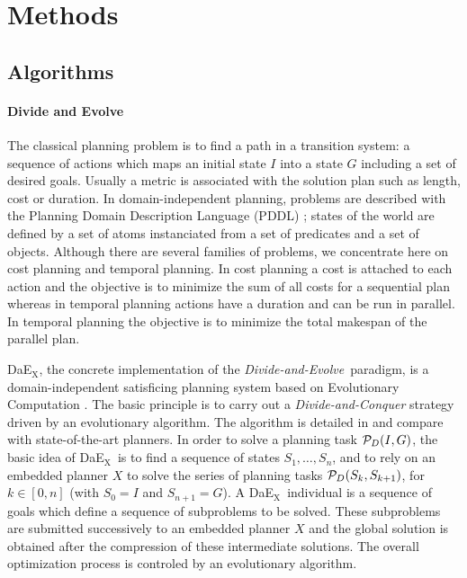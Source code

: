 \documentclass{sig-alternate}
\newcommand{\dae}{{\em Divide-and-Evolve}}
\newcommand{\DAEX}{{\sc DaE$_{\text{X}}$}}
\begin{document}
\section{Methods}

\subsection{Algorithms}

\paragraph{Divide and Evolve} %
The classical planning problem is to find a path in a transition system: a sequence of actions which maps an initial state $I$ into a state $G$ including a set of desired goals. Usually a metric is associated with the solution plan such as length, cost or duration. In domain-independent planning, problems are described with the Planning Domain Description Language (PDDL) \cite{pddl:jair2003}; states of the world are defined by a set of atoms instanciated from a set of predicates and a set of objects. Although there are several families of problems, we concentrate here on cost planning and temporal planning. In cost planning a cost is attached to each action and the objective is to minimize the sum of all costs for a sequential plan whereas in temporal planning actions have a duration and can be run in parallel. In temporal planning the objective is to minimize the total makespan of the parallel plan.

\DAEX, the concrete implementation of the \dae\ paradigm, is a domain-independent satisficing planning system based on Evolutionary Computation \cite{dae:evocop2006}. The basic principle is to carry out a {\em Divide-and-Conquer} strategy driven by an evolutionary algorithm. The algorithm is detailed in \cite{dae:icaps2010} and compare with state-of-the-art planners.
In order to solve a planning task ${\cal P}_D(I,G)$, the basic idea of \DAEX\ is to find a sequence of states $S_1, \ldots, S_n$, and to rely on an embedded planner $X$ to solve the series of planning tasks ${\cal P}_D(S_{k},S_{k+1})$, for $k \in [0,n]$ (with $S_0 = I$ and $S_{n+1} = G$). 
A \DAEX\ individual is a sequence of goals which define a sequence of subproblems to be solved. These subproblems are submitted successively to an embedded planner $X$ and the global solution is obtained after the compression of these intermediate solutions. The overall optimization process is controled by an evolutionary algorithm.
\end{document}
